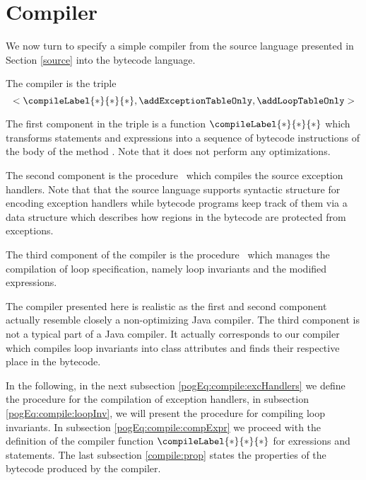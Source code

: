 

\newtheorem{Compiler}{Definition}

\section{Compiler} \label{compile}

We now turn to specify a simple compiler from the source language presented in Section
\ref{source} into the bytecode language.

The compiler is the triple
 $$< \compileLabel{*}{*}{*}, \addExceptionTableOnly , \addLoopTableOnly >$$

 The first component in the triple is a  function $\compileLabel{*}{*}{*}$ which transforms statements and expressions
 into a sequence of bytecode instructions of the body of the method \methodd.
 Note that it does not perform any optimizations.

 The second component is the procedure  
\addExceptionTableOnly \ which compiles  the source exception handlers.
Note that that the source language supports syntactic structure for encoding exception handlers while
 bytecode programs keep track of them via a data structure which describes how  regions 
in the bytecode are protected from exceptions.

 The third component of the compiler is the procedure
  \addLoopTableOnly \ which manages the compilation of loop
specification, namely loop invariants and the modified expressions. 

The compiler presented here is realistic as the first and second component actually resemble closely a non-optimizing Java compiler.
The third component is not a typical part of a Java compiler. It actually corresponds to our \JMLtoBML{} compiler which compiles 
loop invariants into class attributes and finds their respective place in the bytecode.  


In the following, in the next subsection \ref{pogEq:compile:excHandlers} we define the procedure for the compilation of exception handlers,
 in subsection \ref{pogEq:compile:loopInv},  we will present the procedure for compiling loop invariants.
 In  subsection
\ref{pogEq:compile:compExpr} 
we proceed with the definition of the compiler function $\compileLabel{*}{*}{*} $ for exressions and statements. 
The last subsection \ref{compile:prop} states the properties of the bytecode produced by the compiler.




